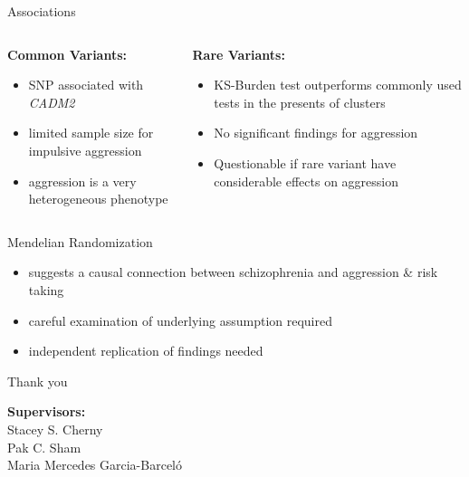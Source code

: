 \documentclass{beamer}
\begin{document}
\begin{frame}[t]{Associations}
  \small
  \begin{columns}[T]
    \begin{column}[T]{0.5\textwidth}
     \textbf{Common Variants:}
     \begin{itemize}
       \item SNP associated with \textit{CADM2}
       \item limited sample size for impulsive aggression
       \item aggression is a very heterogeneous phenotype
     \end{itemize}
   \end{column}
   \begin{column}[T]{0.5\textwidth}
     \textbf{Rare Variants:}
     \begin{itemize}
       \item KS-Burden test outperforms commonly used tests in the presents of clusters
       \item No significant findings for aggression
       \item Questionable if rare variant have considerable effects on aggression
     \end{itemize}
   \end{column}
 \end{columns} 
\end{frame}

\begin{frame}[t]{Mendelian Randomization}
  \begin{itemize}
    \item suggests a causal connection between schizophrenia and aggression \& risk taking
    \item careful examination of underlying assumption required
    \item independent replication of findings needed
  \end{itemize}
\end{frame}

\begin{frame}[t]{Thank you}

  \begin{center}
  \textbf{Supervisors:} \\
    Stacey S. Cherny\\
    Pak C. Sham\\
    Maria Mercedes Garcia-Barcel\'o
  \end{center}
  
\end{frame}


\end{document}
